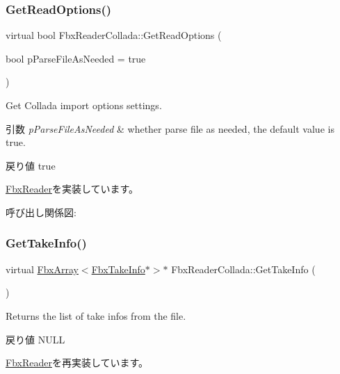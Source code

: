 \subsubsection{\texorpdfstring{Get\+Read\+Options()}{GetReadOptions()}}
{\footnotesize\ttfamily virtual bool Fbx\+Reader\+Collada\+::\+Get\+Read\+Options (\begin{DoxyParamCaption}\item[{bool}]{p\+Parse\+File\+As\+Needed = {\ttfamily true} }\end{DoxyParamCaption})\hspace{0.3cm}{\ttfamily [virtual]}}

Get Collada import options settings. 
\begin{DoxyParams}{引数}
{\em p\+Parse\+File\+As\+Needed} & whether parse file as needed, the default value is true. \\
\hline
\end{DoxyParams}
\begin{DoxyReturn}{戻り値}
true 
\end{DoxyReturn}


\hyperlink{class_fbx_reader_acea3c118db490378c9aed17512396932}{Fbx\+Reader}を実装しています。

呼び出し関係図\+:
\mbox{\label{class_fbx_reader_collada_af772ad8fc79672d06aa9ea6910b81ab0}} 
\subsubsection{\texorpdfstring{Get\+Take\+Info()}{GetTakeInfo()}}
{\footnotesize\ttfamily virtual \hyperlink{class_fbx_array}{Fbx\+Array}$<$\hyperlink{class_fbx_take_info}{Fbx\+Take\+Info}$\ast$$>$$\ast$ Fbx\+Reader\+Collada\+::\+Get\+Take\+Info (\begin{DoxyParamCaption}{ }\end{DoxyParamCaption})\hspace{0.3cm}{\ttfamily [virtual]}}

Returns the list of take infos from the file. \begin{DoxyReturn}{戻り値}
N\+U\+LL 
\end{DoxyReturn}


\hyperlink{class_fbx_reader_a9d7b40684bb3181219945eb0c73fb9d1}{Fbx\+Reader}を再実装しています。

